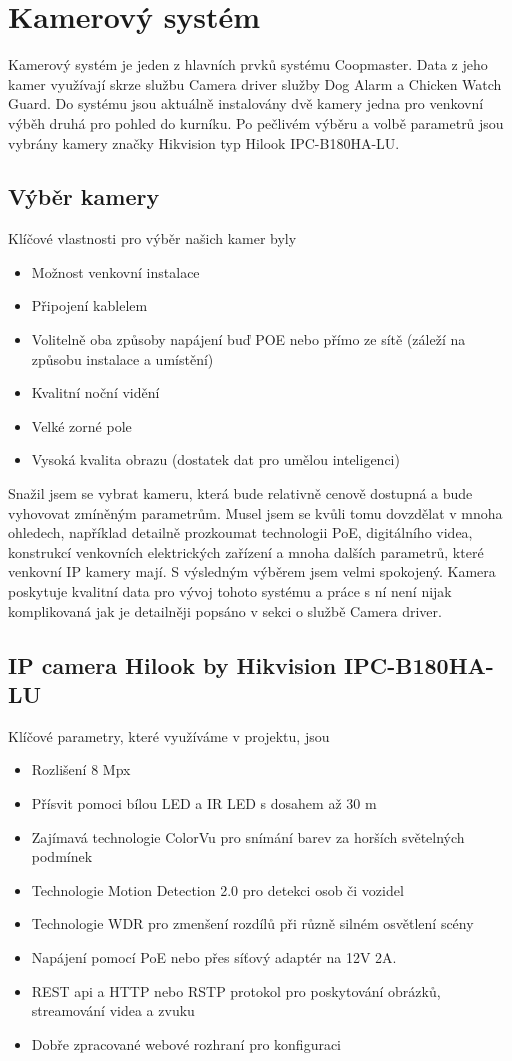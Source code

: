 \section{Kamerový systém}\label{sec:kamerovy-system}
Kamerový systém je jeden z hlavních prvků systému Coopmaster.
Data z jeho kamer využívají skrze službu Camera driver služby Dog Alarm a Chicken Watch Guard.
Do systému jsou aktuálně instalovány dvě kamery jedna pro venkovní výběh druhá pro pohled do kurníku.
Po pečlivém výběru a volbě parametrů jsou vybrány kamery značky Hikvision typ Hilook IPC-B180HA-LU.

\subsection*{Výběr kamery}
Klíčové vlastnosti pro výběr našich kamer byly
\begin{itemize}
    \item Možnost venkovní instalace
    \item Připojení kablelem
    \item Volitelně oba způsoby napájení buď POE nebo přímo ze sítě (záleží na způsobu instalace a umístění)
    \item Kvalitní noční vidění
    \item Velké zorné pole
    \item Vysoká kvalita obrazu (dostatek dat pro umělou inteligenci)
\end{itemize}
Snažil jsem se vybrat kameru, která bude relativně cenově dostupná a bude vyhovovat zmíněným parametrům.
Musel jsem se kvůli tomu dovzdělat v mnoha ohledech, například detailně prozkoumat technologii PoE, digitálního videa, konstrukcí venkovních elektrických zařízení a mnoha dalších parametrů, které venkovní IP kamery mají.
S výsledným výběrem jsem velmi spokojený.
Kamera poskytuje kvalitní data pro vývoj tohoto systému a práce s ní není nijak komplikovaná jak je detailněji popsáno v sekci o službě Camera driver.

\subsection*{IP camera Hilook by Hikvision IPC-B180HA-LU}
Klíčové parametry, které využíváme v projektu, jsou
\begin{itemize}
    \item Rozlišení 8 Mpx
    \item Přísvit pomoci bílou LED a IR LED s dosahem až 30 m
    \item Zajímavá technologie ColorVu pro snímání barev za horších světelných podmínek
    \item Technologie Motion Detection 2.0 pro detekci osob či vozidel
    \item Technologie WDR pro zmenšení rozdílů při různě silném osvětlení scény
    \item Napájení pomocí PoE nebo přes síťový adaptér na 12V 2A.
    \item REST api a HTTP nebo RSTP protokol pro poskytování obrázků, streamování videa a zvuku
    \item Dobře zpracované webové rozhraní pro konfiguraci
\end{itemize}

%
%
%
